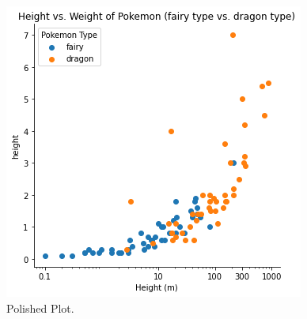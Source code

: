 \begin{figure}
	\includegraphics[width=\textwidth,height=\textheight,keepaspectratio]{images/figure45.png}
	\caption{Polished Plot.}\label{fig:figure45}
\end{figure}
